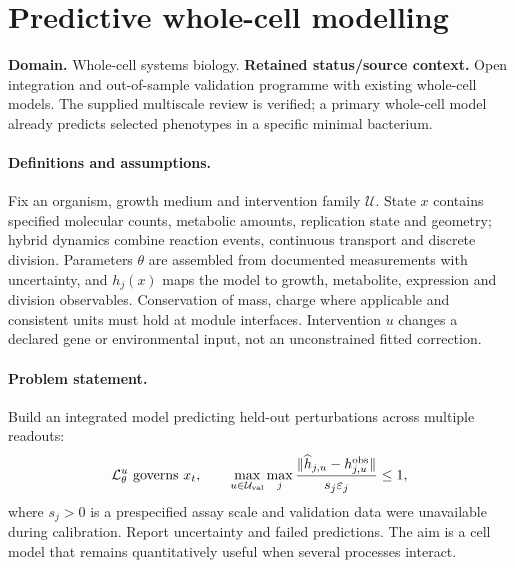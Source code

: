\documentclass[11pt]{article}
\begin{document}
\section*{Predictive whole-cell modelling}
\label{prob:041}
\label{rank:4}
\par\smallskip

\noindent\textbf{Domain.} Whole-cell systems biology. \quad \textbf{Retained status/source context.} Open integration and out-of-sample validation programme with existing whole-cell models. The supplied multiscale review is verified; a primary whole-cell model already predicts selected phenotypes in a specific minimal bacterium.
\paragraph{Definitions and assumptions.} Fix an organism, growth medium and intervention family $\mathcal U$. State $x$ contains specified molecular counts, metabolic amounts, replication state and geometry; hybrid dynamics combine reaction events, continuous transport and discrete division. Parameters $\theta$ are assembled from documented measurements with uncertainty, and $h_j(x)$ maps the model to growth, metabolite, expression and division observables. Conservation of mass, charge where applicable and consistent units must hold at module interfaces. Intervention $u$ changes a declared gene or environmental input, not an unconstrained fitted correction.
\paragraph{Problem statement.} Build an integrated model predicting held-out perturbations across multiple readouts:
\[
\mathcal L_\theta^u\text{ governs }x_t,
\qquad \max_{u\in\mathcal U_{\rm val}}\max_j
\frac{\|\widehat h_{j,u}-h_{j,u}^{\rm obs}\|}{s_j\varepsilon_j}\leq1,
\]
where $s_j>0$ is a prespecified assay scale and validation data were unavailable during calibration. Report uncertainty and failed predictions. The aim is a cell model that remains quantitatively useful when several processes interact.
\end{document}
